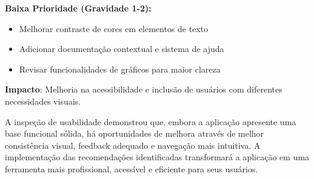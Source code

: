 \textbf{Baixa Prioridade (Gravidade 1-2):}
\begin{itemize}
    \item Melhorar contraste de cores em elementos de texto
    \item Adicionar documentação contextual e sistema de ajuda
    \item Revisar funcionalidades de gráficos para maior clareza
\end{itemize}
\textbf{Impacto}: Melhoria na acessibilidade e inclusão de usuários com diferentes necessidades visuais.

A inspeção de usabilidade demonstrou que, embora a aplicação apresente uma base funcional sólida, há oportunidades de melhora através de melhor consistência visual, feedback adequado e navegação mais intuitiva. A implementação das recomendações identificadas transformará a aplicação em uma ferramenta mais profissional, acessível e eficiente para seus usuários.


